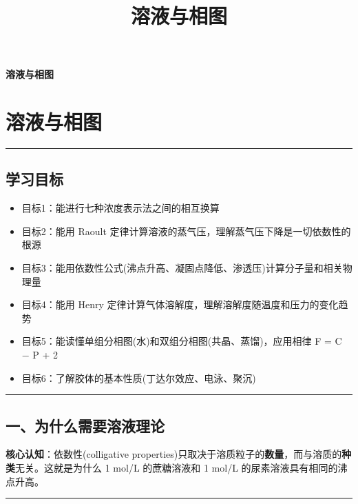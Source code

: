 \documentclass[a4paper,11pt]{ctexart}
\title{溶液与相图}
\date{}
\providecommand{\tightlist}{\setlength{\itemsep}{0pt}\setlength{\parskip}{0pt}}
\newcommand{\箭}{\ensuremath{\rightarrow}}
\newcommand{\左箭}{\ensuremath{\leftarrow}}
\newcommand{\上箭}{\ensuremath{\uparrow}}
\newcommand{\下箭}{\ensuremath{\downarrow}}
\newcommand{\衡}{\ensuremath{\rightleftharpoons}}
\newcommand{\双箭}{\ensuremath{\leftrightarrow}}
\newcommand{\约等于}{\ensuremath{\approx}}
\newcommand{\小于等于}{\ensuremath{\leq}}
\newcommand{\大于等于}{\ensuremath{\geq}}
\newcommand{\不等于}{\ensuremath{\neq}}
\newcommand{\西格马}{\ensuremath{\sigma}}
\newcommand{\派}{\ensuremath{\pi}}
\begin{document}
\thispagestyle{plain}
\begin{center}
{\bfseries 溶液与相图\par}
\end{center}
\vspace{1em}
\section{溶液与相图}\label{ux6eb6ux6db2ux4e0eux76f8ux56fe}

\begin{center}\rule{0.5\linewidth}{0.5pt}\end{center}

\subsection{学习目标}\label{ux5b66ux4e60ux76eeux6807}

\begin{itemize}
\tightlist
\item
  目标1：能进行七种浓度表示法之间的相互换算
\item
  目标2：能用 Raoult 定律计算溶液的蒸气压，理解蒸气压下降是一切依数性的根源
\item
  目标3：能用依数性公式(沸点升高、凝固点降低、渗透压)计算分子量和相关物理量
\item
  目标4：能用 Henry 定律计算气体溶解度，理解溶解度随温度和压力的变化趋势
\item
  目标5：能读懂单组分相图(水)和双组分相图(共晶、蒸馏)，应用相律 F = C − P + 2
\item
  目标6：了解胶体的基本性质(丁达尔效应、电泳、聚沉)
\end{itemize}

\begin{center}\rule{0.5\linewidth}{0.5pt}\end{center}

\subsection{一、为什么需要溶液理论}\label{ux4e00ux4e3aux4ec0ux4e48ux9700ux8981ux6eb6ux6db2ux7406ux8bba}

\textbf{核心认知}：依数性(colligative properties)只取决于溶质粒子的\textbf{数量}，而与溶质的\textbf{种类}无关。这就是为什么 1 mol/L 的蔗糖溶液和 1 mol/L 的尿素溶液具有相同的沸点升高。

\begin{center}\rule{0.5\linewidth}{0.5pt}\end{center}
\end{document}
